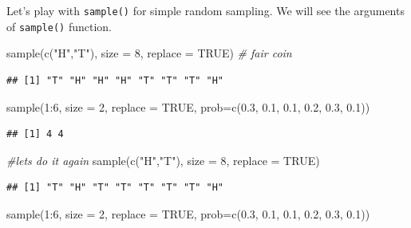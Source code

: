 \documentclass[
]{book}
\newenvironment{Shaded}{\begin{snugshade}}{\end{snugshade}}
\newcommand{\AttributeTok}[1]{\textcolor[rgb]{0.77,0.63,0.00}{#1}}
\newcommand{\CommentTok}[1]{\textcolor[rgb]{0.56,0.35,0.01}{\textit{#1}}}
\newcommand{\ConstantTok}[1]{\textcolor[rgb]{0.00,0.00,0.00}{#1}}
\newcommand{\DecValTok}[1]{\textcolor[rgb]{0.00,0.00,0.81}{#1}}
\newcommand{\FloatTok}[1]{\textcolor[rgb]{0.00,0.00,0.81}{#1}}
\newcommand{\FunctionTok}[1]{\textcolor[rgb]{0.00,0.00,0.00}{#1}}
\newcommand{\NormalTok}[1]{#1}
\newcommand{\SpecialCharTok}[1]{\textcolor[rgb]{0.00,0.00,0.00}{#1}}
\newcommand{\StringTok}[1]{\textcolor[rgb]{0.31,0.60,0.02}{#1}}
\begin{document}
Let's play with \texttt{sample()} for simple random sampling. We will see the arguments of \texttt{sample()} function.

\begin{Shaded}
\begin{Highlighting}[]
\FunctionTok{sample}\NormalTok{(}\FunctionTok{c}\NormalTok{(}\StringTok{"H"}\NormalTok{,}\StringTok{"T"}\NormalTok{), }\AttributeTok{size =} \DecValTok{8}\NormalTok{, }\AttributeTok{replace =} \ConstantTok{TRUE}\NormalTok{)  }\CommentTok{\# fair coin}
\end{Highlighting}
\end{Shaded}

\begin{verbatim}
## [1] "T" "H" "H" "H" "T" "T" "T" "H"
\end{verbatim}

\begin{Shaded}
\begin{Highlighting}[]
\FunctionTok{sample}\NormalTok{(}\DecValTok{1}\SpecialCharTok{:}\DecValTok{6}\NormalTok{, }\AttributeTok{size =} \DecValTok{2}\NormalTok{, }\AttributeTok{replace =} \ConstantTok{TRUE}\NormalTok{, }\AttributeTok{prob=}\FunctionTok{c}\NormalTok{(}\FloatTok{0.3}\NormalTok{, }\FloatTok{0.1}\NormalTok{, }\FloatTok{0.1}\NormalTok{, }\FloatTok{0.2}\NormalTok{, }\FloatTok{0.3}\NormalTok{, }\FloatTok{0.1}\NormalTok{))}
\end{Highlighting}
\end{Shaded}

\begin{verbatim}
## [1] 4 4
\end{verbatim}

\begin{Shaded}
\begin{Highlighting}[]
\CommentTok{\#let\textquotesingle{}s do it again}
\FunctionTok{sample}\NormalTok{(}\FunctionTok{c}\NormalTok{(}\StringTok{"H"}\NormalTok{,}\StringTok{"T"}\NormalTok{), }\AttributeTok{size =} \DecValTok{8}\NormalTok{, }\AttributeTok{replace =} \ConstantTok{TRUE}\NormalTok{)  }
\end{Highlighting}
\end{Shaded}

\begin{verbatim}
## [1] "T" "H" "T" "T" "T" "T" "T" "H"
\end{verbatim}

\begin{Shaded}
\begin{Highlighting}[]
\FunctionTok{sample}\NormalTok{(}\DecValTok{1}\SpecialCharTok{:}\DecValTok{6}\NormalTok{, }\AttributeTok{size =} \DecValTok{2}\NormalTok{, }\AttributeTok{replace =} \ConstantTok{TRUE}\NormalTok{, }\AttributeTok{prob=}\FunctionTok{c}\NormalTok{(}\FloatTok{0.3}\NormalTok{, }\FloatTok{0.1}\NormalTok{, }\FloatTok{0.1}\NormalTok{, }\FloatTok{0.2}\NormalTok{, }\FloatTok{0.3}\NormalTok{, }\FloatTok{0.1}\NormalTok{))}
\end{Highlighting}
\end{Shaded}
\end{document}
